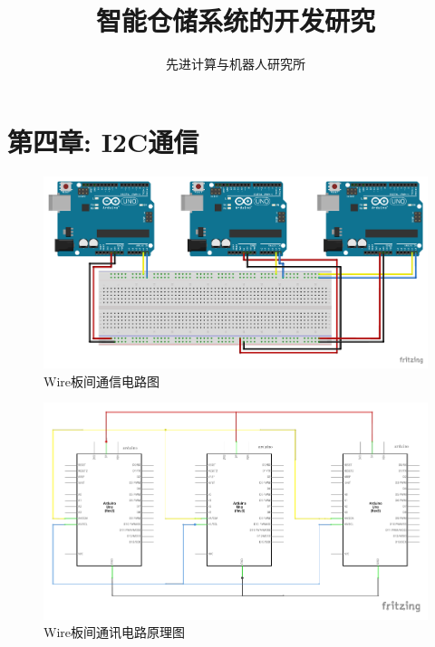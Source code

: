 \documentclass{article}
\newcommand{\xiaosihao}{\fontsize{12pt}{\baselineskip}\selectfont}
\begin{document}
	
\newtheorem{example}{例}             %
\newtheorem{algorithm}{算法}
\newtheorem{theorem}{定理}[section]  %
\newtheorem{definition}{定义}
\newtheorem{axiom}{公理}
\newtheorem{property}{性质}
\newtheorem{proposition}{命题}
\newtheorem{lemma}{引理}
\newtheorem{corollary}{推论}
\newtheorem{remark}{注解}
\newtheorem{condition}{条件}
\newtheorem{conclusion}{结论}
\newtheorem{assumption}{假设}

\renewcommand{\contentsname}{目录}  %
\renewcommand{\abstractname}{摘要}  %
\renewcommand{\refname}{参考文献}   %
\renewcommand{\indexname}{索引}
\renewcommand{\figurename}{图}
\renewcommand{\tablename}{表}
\renewcommand{\appendixname}{附录}
\renewcommand{\algorithm}{算法}	

\title{智能仓储系统的开发研究}
\author{\xiaosihao 先进计算与机器人研究所}
		
\maketitle
		
\tableofcontents
\newpage

\section{第四章: I2C通信}
\begin{figure}[h]
    \centering
    \includegraphics[width=0.6\linewidth]{../picture/I2C_.pdf}
    \caption{Wire板间通信电路图}
    \label{fig:Wire板间通信电路图}
\end{figure}

\begin{figure}[h]
     \centering
     \includegraphics[width=0.6\linewidth]{../picture/I2C_line.pdf}
     \caption{Wire板间通讯电路原理图}
     \label{fig:Wire板间通讯电路原理图}
\end{figure}
\end{document}
